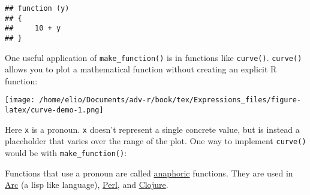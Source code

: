 \begin{verbatim}
## function (y) 
## {
##     10 + y
## }
\end{verbatim}

One useful application of \texttt{make\_function()} is in functions like
\texttt{curve()}. \texttt{curve()} allows you to plot a mathematical
function without creating an explicit R function:

\begin{Shaded}
\begin{Highlighting}[]
\NormalTok{(}\NormalTok{(}\NormalTok{(} \OperatorTok{*}\StringTok{ } \NormalTok{)}
\end{Highlighting}
\end{Shaded}

\texttt{[image: /home/elio/Documents/adv-r/book/tex/Expressions\_files/figure-latex/curve-demo-1.png]}

Here \texttt{x} is a pronoun. \texttt{x} doesn't represent a single
concrete value, but is instead a placeholder that varies over the range
of the plot. One way to implement \texttt{curve()} would be with
\texttt{make\_function()}:

\begin{Shaded}
\begin{Highlighting}[]
\StringTok{ } \NormalTok{(}\NormalTok{, }\NormalTok{), } \NormalTok{, }
                    \NormalTok{()) \{}
\StringTok{ }\NormalTok{(}\NormalTok{(}\NormalTok{ ), }

\StringTok{ }\NormalTok{(xlim[}\NormalTok{], xlim[}\NormalTok{], }
\StringTok{ }

   \NormalTok{, } \NormalTok{(}
\NormalTok{\}}
\end{Highlighting}
\end{Shaded}

Functions that use a pronoun are called
\href{http://en.wikipedia.org/wiki/Anaphora_(linguistics)}{anaphoric}
functions. They are used in
\href{http://www.arcfn.com/doc/anaphoric.html}{Arc} (a lisp like
language),
\href{http://www.perlmonks.org/index.pl?node_id=666047}{Perl}, and
\href{http://amalloy.hubpages.com/hub/Unhygenic-anaphoric-Clojure-macros-for-fun-and-profit}{Clojure}.
 

